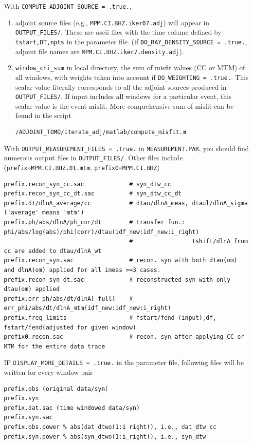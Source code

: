 \documentclass[11pt,titlepage,fleqn]{article}
\begin{document}
With \verb+COMPUTE_ADJOINT_SOURCE = .true.+,  
\begin{enumerate}
\item adjoint source files (e.g., \verb+MPM.CI.BHZ.iker07.adj+) will appear
in \verb+OUTPUT_FILES/+. These are ascii files with the time colume defined by \verb+tstart,DT,npts+ in the parameter file.
(if \verb+DO_RAY_DENSITY_SOURCE = .true.+, adjoint file names are \verb+MPM.CI.BHZ.iker7.density.adj+).

\item \verb+window_chi_sum+ in local directory, the sum of misfit values (CC or MTM) of all windows, with weights taken into account if \verb+DO_WEIGHTING = .true.+. This scalar value literally corresponds to all the adjoint sources produced in  \verb+OUTPUT_FILES/+. If input includes all windows for a particular event, this scalar value is the event misfit.
More comprehensive sum of misfit can be found in the script
\begin{verbatim}
/ADJOINT_TOMO/iterate_adj/matlab/compute_misfit.m
\end{verbatim}
\end{enumerate}

With \verb+OUTPUT_MEASUREMENT_FILES = .true.+ in \verb+MEASUREMENT.PAR+, you should find numerous output files in \verb+OUTPUT_FILES/+.
Other files include (\verb+prefix=MPM.CI.BHZ.01.mtm+, \verb+prefix0=MPM.CI.BHZ+)
\begin{verbatim}
prefix.recon_syn_cc.sac             # syn_dtw_cc
prefix.recon_syn_cc_dt.sac          # syn_dtw_cc_dt
prefix.dt/dlnA_average/cc           # dtau/dlnA_meas, dtaul/dlnA_sigma ('average' means 'mtm')
prefix.ph/abs/dlnA/ph_cor/dt        # transfer fun.:  phi/abs/log(abs)/phi(corr)/dtau(idf_new:idf_new:i_right)       
                                    #                 tshift/dlnA from cc are added to dtau/dlnA_wt
prefix.recon_syn.sac                # recon. syn with both dtau(om) and dlnA(om) applied for all imeas >=3 cases.
prefix.recon_syn_dt.sac             # reconstructed syn with only dtau(om) applied
prefix.err_ph/abs/dt/dlnA[_full]    # err_phi/abs/dt/dlnA_mtm(idf_new:idf_new:i_right)
prefix.freq_limits                  # fstart/fend (input),df, fstart/fend(adjusted for given window)
prefix0.recon.sac                   # recon. syn after applying CC or MTM for the entire data trace
\end{verbatim}

IF \verb+DISPLAY_MORE_DETAILS = .true.+ in the parameter file, following files will be written for every window pair
\begin{verbatim}
prefix.obs (original data/syn)
prefix.syn
prefix.dat.sac (time windowed data/syn)
prefix.syn.sac 
prefix.obs.power % abs(dat_dtwo(1:i_right)), i.e., dat_dtw_cc
prefix.syn.power % abs(syn_dtwo(1:i_right)), i.e., syn_dtw
\end{verbatim}
\end{document}
